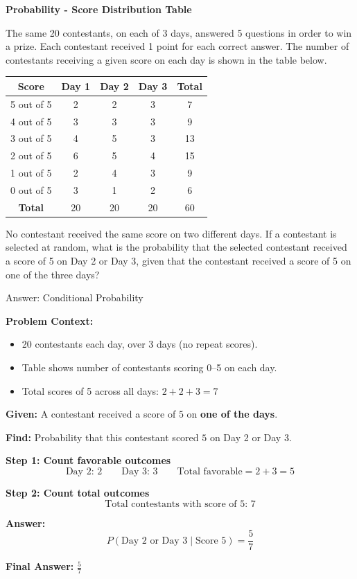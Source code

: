 \documentclass{beamer}
\begin{document}
\begin{frame}{\textbf{Probability - Score Distribution Table}}
\small

The same 20 contestants, on each of 3 days, answered 5 questions in order to win a prize. Each contestant received 1 point for each correct answer. The number of contestants receiving a given score on each day is shown in the table below.

\begin{center}
\begin{tabular}{|c|c|c|c|c|}
\hline
\textbf{Score} & \textbf{Day 1} & \textbf{Day 2} & \textbf{Day 3} & \textbf{Total} \\
\hline
5 out of 5 & 2 & 2 & 3 & 7 \\
4 out of 5 & 3 & 3 & 3 & 9 \\
3 out of 5 & 4 & 5 & 3 & 13 \\
2 out of 5 & 6 & 5 & 4 & 15 \\
1 out of 5 & 2 & 4 & 3 & 9 \\
0 out of 5 & 3 & 1 & 2 & 6 \\
\hline
\textbf{Total} & 20 & 20 & 20 & 60 \\
\hline
\end{tabular}
\end{center}

No contestant received the same score on two different days. If a contestant is selected at random, what is the probability that the selected contestant received a score of 5 on Day 2 or Day 3, given that the contestant received a score of 5 on one of the three days?

\end{frame}

\begin{frame}{Answer: Conditional Probability}
\small

\textbf{Problem Context:}
\begin{itemize}
    \item 20 contestants each day, over 3 days (no repeat scores).
    \item Table shows number of contestants scoring 0–5 on each day.
    \item Total scores of 5 across all days: $2 + 2 + 3 = 7$
\end{itemize}


\textbf{Given:} A contestant received a score of $5$ on \textbf{one of the days}.

\textbf{Find:} Probability that this contestant scored $5$ on Day 2 or Day 3.


\textbf{Step 1: Count favorable outcomes}
\[
\text{Day 2: } 2 \qquad \text{Day 3: } 3 \qquad \text{Total favorable} = 2 + 3 = 5
\]

\vspace{0.1cm}
\textbf{Step 2: Count total outcomes}
\[
\text{Total contestants with score of 5: } 7
\]

\vspace{0.1cm}
\textbf{Answer:}
\[
P(\text{Day 2 or Day 3} \mid \text{Score 5}) = \frac{5}{7}
\]

\textbf{Final Answer:} $\boxed{\frac{5}{7}}$

\end{frame}
\end{document}
